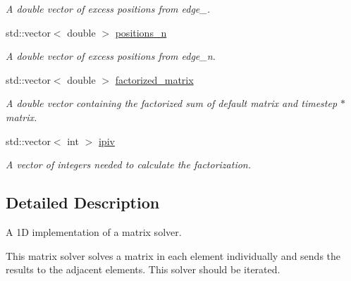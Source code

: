 \begin{DoxyCompactItemize}
\begin{DoxyCompactList}\small\item\em A double vector of excess positions from edge\-\_. \end{DoxyCompactList}\item 
\hypertarget{classone__d_1_1solver_a63b789bf32c435c56d4874589fdc81f3}{std\-::vector$<$ double $>$ \hyperlink{classone__d_1_1solver_a63b789bf32c435c56d4874589fdc81f3}{positions\-\_\-n}}\label{classone__d_1_1solver_a63b789bf32c435c56d4874589fdc81f3}

\begin{DoxyCompactList}\small\item\em A double vector of excess positions from edge\-\_\-n. \end{DoxyCompactList}\item 
\hypertarget{classone__d_1_1solver_a422a65f49ae474f7f3a30d1eaca19641}{std\-::vector$<$ double $>$ \hyperlink{classone__d_1_1solver_a422a65f49ae474f7f3a30d1eaca19641}{factorized\-\_\-matrix}}\label{classone__d_1_1solver_a422a65f49ae474f7f3a30d1eaca19641}

\begin{DoxyCompactList}\small\item\em A double vector containing the factorized sum of default matrix and timestep $\ast$ matrix. \end{DoxyCompactList}\item 
\hypertarget{classone__d_1_1solver_a668a33255403a66f8f44167fbf55f009}{std\-::vector$<$ int $>$ \hyperlink{classone__d_1_1solver_a668a33255403a66f8f44167fbf55f009}{ipiv}}\label{classone__d_1_1solver_a668a33255403a66f8f44167fbf55f009}

\begin{DoxyCompactList}\small\item\em A vector of integers needed to calculate the factorization. \end{DoxyCompactList}\end{DoxyCompactItemize}


\subsection{Detailed Description}
A 1\-D implementation of a matrix solver. 



 This matrix solver solves a matrix in each element individually and sends the results to the adjacent elements. This solver should be iterated. 

